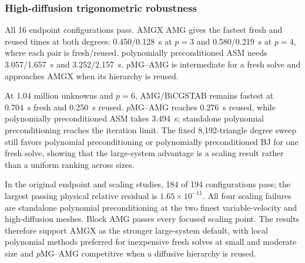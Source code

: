 \subsubsection{High-diffusion trigonometric robustness}
All 16 endpoint configurations pass.  AMGX AMG gives the fastest fresh and
reused times at both degrees: 0.450/0.128~s at $p=3$ and 0.580/0.219~s at
$p=4$, where each pair is fresh/reused.  polynomially preconditioned ASM needs 3.057/1.657~s and
3.252/2.157~s.  $p$MG--AMG is intermediate for a fresh solve and approaches
AMGX when its hierarchy is reused.

At 1.04 million unknowns and $p=6$, AMG/BiCGSTAB remains fastest at
0.704~s fresh and 0.250~s reused.  $p$MG--AMG reaches 0.276~s reused, while
polynomially preconditioned ASM takes 3.494~s; standalone polynomial preconditioning reaches the iteration limit.  The fixed
8,192-triangle degree sweep still favors polynomial preconditioning or polynomially preconditioned BJ for one fresh solve,
showing that the large-system advantage is a scaling result rather than a
uniform ranking across sizes.

\begin{table}[!htbp]
 \centering\small
 \setlength{\tabcolsep}{3.2pt}
 
 \caption{Selected family configurations on 99,458 triangles at $p=6$
 (1,041,187 trace unknowns).  Reused time is a mean; fresh time is a median.
 $p$MG--AMG selects the best reused-time policy and reports both of its timings.
 Bold entries are the best passing times among the displayed rows.  NC denotes
 failure of the common acceptance contract.}
 \label{tab:adr-focused-largest}
\end{table}

In the original endpoint and scaling studies, 184 of 194 configurations pass; the
largest passing physical relative residual is $1.65\times10^{-11}$.  All four
scaling failures are standalone polynomial preconditioning at the two finest variable-velocity and
high-diffusion meshes.  Block AMG passes every focused scaling point.  The
results therefore support AMGX as the stronger large-system default, with
local polynomial methods preferred for inexpensive fresh solves at small and
moderate size and $p$MG--AMG competitive when a diffusive hierarchy is reused.
